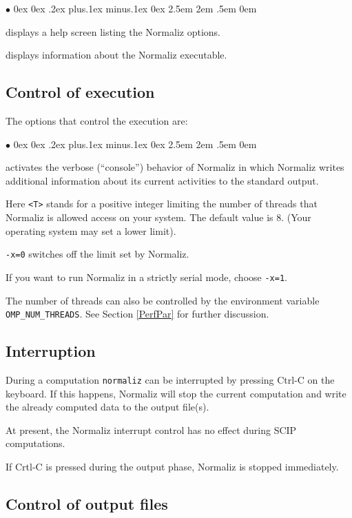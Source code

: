 \documentclass[12pt,a4paper]{scrartcl}
\newcounter{listi}
\newcommand{\stdli}{ \topsep0ex \partopsep0ex %
\parsep.2ex plus.1ex minus.1ex \itemsep0ex%
\leftmargin2.5em \labelwidth2em \labelsep.5em \rightmargin0em}%
\renewenvironment{itemize}{\begin{list}{{$\bullet$}}{\stdli}}{\end{list}}
\theoremstyle{definition}
\def\itemtt[#1]{\item[\textbf{\ttt{#1}}]}
\def\ttt{\texttt}
\begin{document}
\begin{itemize}
\itemtt [-{}-help, -?] displays a help screen listing the Normaliz options.

\itemtt [-{}-version] displays information about the Normaliz executable.
\end{itemize}


\subsection{Control of execution}\label{exec}

The options that control the execution are:

\begin{itemize}
	\itemtt[{-}{-}verbose, -c] activates the verbose (``console'') behavior of
	Normaliz in which Normaliz writes additional
	information about its current activities to the
	standard output.
	
	\itemtt[-x=<T>] Here \ttt{<T>} stands for a positive
	integer limiting the number of threads that Normaliz
	is allowed access on your system. The default value is
	$8$. (Your operating system may set a lower limit).
	
	\ttt{-x=0} switches off the limit set by Normaliz.
	
	If you want to run
	Normaliz in a strictly serial mode, choose
	\ttt{-x=1}.
\end{itemize}

The number of threads can also be controlled by the environment
variable \verb+OMP_NUM_THREADS+. See Section \ref{PerfPar} for
further discussion.

\subsection{Interruption}\label{interrupt}

During a computation \verb|normaliz| can be interrupted by pressing Ctrl-C on the keyboard. If this happens, Normaliz will stop the current computation and write the already computed data to the output file(s).

At present, the Normaliz interrupt control has no effect during SCIP computations.

If Crtl-C is pressed during the output phase, Normaliz is stopped immediately.

\subsection{Control of output files}\label{outcontrol}
\end{document}
